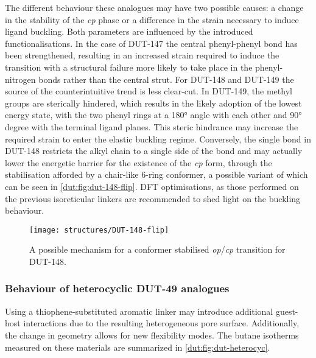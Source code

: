The different behaviour these analogues may have two possible
causes: a change in the stability of the \textit{cp} phase or a 
difference in the strain necessary to induce ligand buckling. Both
parameters are influenced by the introduced functionalisations. 
In the case of DUT-147 the central phenyl-phenyl bond
has been strengthened, resulting in an increased strain required to
induce the transition with a structural failure more likely to take place 
in the phenyl-nitrogen bonds rather than the central strut. 
For DUT-148 and DUT-149 the source of the 
counterintuitive trend is less clear-cut. In DUT-149, the methyl
groups are sterically hindered, which results in the likely
adoption of the lowest energy state, with the two phenyl rings
at a \ang{180} angle with each other and \ang{90} degree with the
terminal ligand planes.
This steric hindrance may increase the required strain to 
enter the elastic buckling regime. Conversely, the 
single bond in DUT-148 restricts the alkyl chain to a single 
side of the bond and may actually lower the energetic barrier for
the existence of the \textit{cp} form, through the stabilisation
afforded by a chair-like 6-ring conformer, a possible variant 
of which can be seen in \autoref{dut:fig:dut-148-flip}. 
\gls{DFT} optimisations, as those performed on the previous isoreticular
linkers are recommended to shed light on the buckling behaviour.

\begin{figure}[htb]
    \centering
    \texttt{[image: structures/DUT-148-flip]}%
    \caption{A possible mechanism for a conformer stabilised 
    \textit{op}/\textit{cp} transition for DUT-148.}%
    \label{dut:fig:dut-148-flip}
\end{figure}

\subsubsection{Behaviour of heterocyclic DUT-49 analogues}

Using a thiophene-substituted aromatic linker may introduce additional
guest-host interactions due to the resulting heterogeneous pore
surface. Additionally, the change in geometry allows for new 
flexibility modes. The butane isotherms measured on these materials
are summarized in \autoref{dut:fig:dut-heterocyc}.

